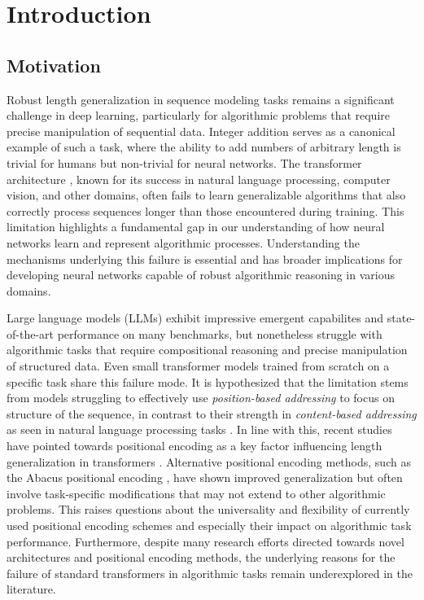\chapter{Introduction}\label{introduction}

\section{Motivation}

Robust length generalization in sequence modeling tasks remains a significant challenge in deep learning, particularly for algorithmic problems that require precise manipulation of sequential data. Integer addition serves as a canonical example of such a task, where the ability to add numbers of arbitrary length is trivial for humans but non-trivial for neural networks. The transformer architecture \cite{vaswani_attention_2017}, known for its success in natural language processing, computer vision, and other domains, often fails to learn generalizable algorithms that also correctly process sequences longer than those encountered during training. This limitation highlights a fundamental gap in our understanding of how neural networks learn and represent algorithmic processes. Understanding the mechanisms underlying this failure is essential and has broader implications for developing neural networks capable of robust algorithmic reasoning in various domains.

Large language models (LLMs) exhibit impressive emergent capabilites and state-of-the-art performance on many benchmarks, but nonetheless struggle with algorithmic tasks that require compositional reasoning and precise manipulation of structured data. Even small transformer models trained from scratch on a specific task share this failure mode. It is hypothesized that the limitation stems from models struggling to effectively use \emph{position-based addressing} to focus on structure of the sequence, in contrast to their strength in \emph{content-based addressing} as seen in natural language processing tasks \parencite{ebrahimi_your_2024}. In line with this, recent studies have pointed towards positional encoding as a key factor influencing length generalization in transformers \cite{mcleish_transformers_2024,zhou_transformers_2024}. Alternative positional encoding methods, such as the Abacus positional encoding \cite{mcleish_transformers_2024}, have shown improved generalization but often involve task-specific modifications that may not extend to other algorithmic problems. This raises questions about the universality and flexibility of currently used positional encoding schemes and especially their impact on algorithmic task performance. Furthermore, despite many research efforts directed towards novel architectures and positional encoding methods, the underlying reasons for the failure of standard transformers in algorithmic tasks remain underexplored in the literature.

